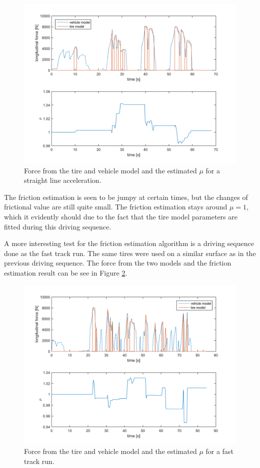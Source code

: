 \begin{figure}[h]
	\centering
	\includegraphics[width=1.0\textwidth]{Pictures/force_mue_olika_acc}
	\caption {Force from the tire and vehicle model and the estimated $ \mu $ for a straight line acceleration.}
	\label{force_mue_olika_acc}
\end{figure}

The friction estimation is seen to be jumpy at certain times, but the changes of frictional value are still quite small. The friction estimation stays around $ \mu = 1 $, which it evidently should due to the fact that the tire model parameters are fitted during this driving sequence. 

A more interesting test for the friction estimation algorithm is a driving sequence done as the fast track run. The same tires were used on a similar surface as in the previous driving sequence. The force from the two models and the friction estimation result can be see in Figure \ref{force_mue_race}. 

\begin{figure}[h]
	\centering
	\includegraphics[width=1.0\textwidth]{Pictures/force_mue_race}
	\caption {Force from the tire and vehicle model and the estimated $ \mu $ for a fast track run.}
	\label{force_mue_race}
\end{figure}

